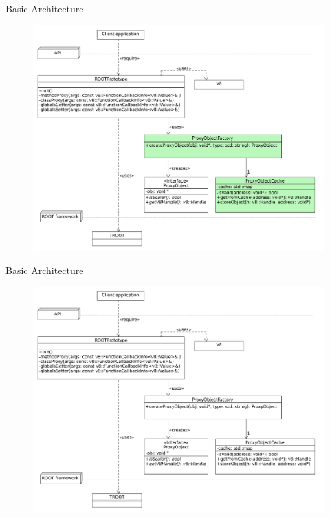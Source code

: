 \begin{frame}{Basic Architecture}
  \begin{figure}[htb]
    \centering
      \includegraphics[width=\textwidth, height=.85\textheight, keepaspectratio]{./resources/architecture/architecture_h5.pdf}
  \end{figure}
\end{frame}

\begin{frame}{Basic Architecture}
  \begin{figure}[htb]
    \centering
      \includegraphics[width=\textwidth, height=.85\textheight, keepaspectratio]{./resources/architecture/architecture_h6.pdf}
  \end{figure}
\end{frame}
